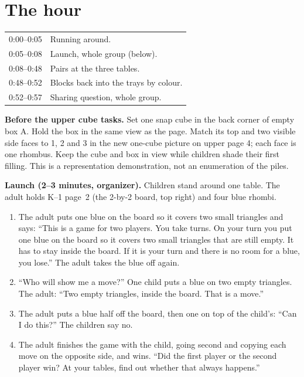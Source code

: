 \documentclass[10pt]{article}
\begin{document}
\section{The hour}

\begin{xltabular}{\linewidth}{L{0.9in} Y}
:00--0:05 & Running around.\\
0:05--0:08 & Launch, whole group (below).\\
0:08--0:48 & Pairs at the three tables.\\
0:48--0:52 & Blocks back into the trays by colour.\\
0:52--0:57 & Sharing question, whole group.\\
\bottomrule
\end{xltabular}

\textbf{Before the upper cube tasks.} Set one snap cube in the back corner of empty box A. Hold the box in the same view as the page. Match its top and two visible side faces to 1, 2 and 3 in the new one-cube picture on upper page 4; each face is one rhombus. Keep the cube and box in view while children shade their first filling. This is a representation demonstration, not an enumeration of the piles.

\textbf{Launch (2--3 minutes, organizer).} Children stand around one table. The adult holds K--1 page~2 (the 2-by-2 board, top right) and four blue rhombi.
\begin{enumerate}
\item The adult puts one blue on the board so it covers two small triangles and says: ``This is a game for two players. You take turns. On your turn you put one blue on the board so it covers two small triangles that are still empty. It has to stay inside the board. If it is your turn and there is no room for a blue, you lose.'' The adult takes the blue off again.
\item ``Who will show me a move?'' One child puts a blue on two empty triangles. The adult: ``Two empty triangles, inside the board. That is a move.''
\item The adult puts a blue half off the board, then one on top of the child's: ``Can I do this?'' The children say no.
\item The adult finishes the game with the child, going second and copying each move on the opposite side, and wins. ``Did the first player or the second player win? At your tables, find out whether that always happens.''
\end{enumerate}
\end{document}
